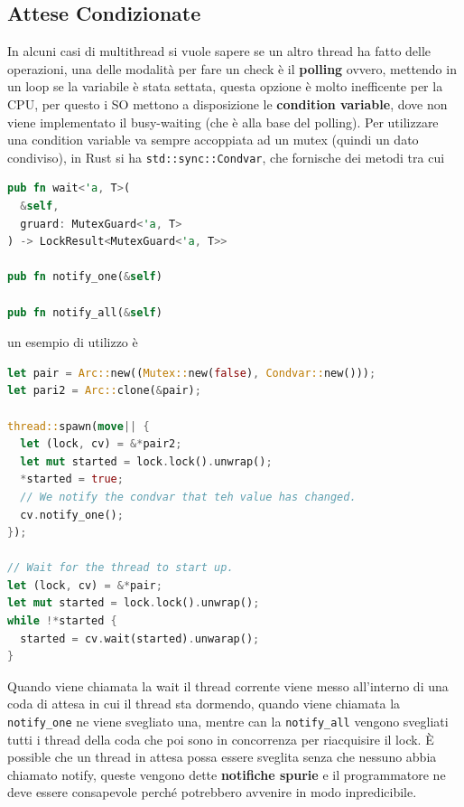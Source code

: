 \documentclass[12pt]{article}
\begin{document}
\subsection{Attese Condizionate}
In alcuni casi di multithread si vuole sapere se un altro thread ha fatto delle operazioni, una delle modalit\`a per fare un check \`e il \textbf{polling} ovvero, mettendo in un loop se la variabile \`e stata settata, questa opzione \`e molto inefficente per la CPU, per questo i SO mettono a disposizione le \textbf{condition variable}, dove non viene implementato il busy-waiting (che \`e alla base del polling). Per utilizzare una condition variable va sempre accoppiata ad un mutex (quindi un dato condiviso), in Rust si ha \texttt{std::sync::Condvar}, che fornische dei metodi tra cui
\begin{lstlisting}[language=rust]
pub fn wait<'a, T>(
  &self,
  gruard: MutexGuard<'a, T>
) -> LockResult<MutexGuard<'a, T>>

pub fn notify_one(&self)

pub fn notify_all(&self)
\end{lstlisting}
un esempio di utilizzo \`e
\begin{lstlisting}[language=rust]
let pair = Arc::new((Mutex::new(false), Condvar::new()));
let pari2 = Arc::clone(&pair);

thread::spawn(move|| {
  let (lock, cv) = &*pair2;
  let mut started = lock.lock().unwrap();
  *started = true;
  // We notify the condvar that teh value has changed.
  cv.notify_one();
});

// Wait for the thread to start up.
let (lock, cv) = &*pair;
let mut started = lock.lock().unwrap();
while !*started {
  started = cv.wait(started).unwarap();
}
\end{lstlisting}
Quando viene chiamata la wait il thread corrente viene messo all'interno di una coda di attesa in cui il thread sta dormendo, quando viene chiamata la \texttt{notify\_one} ne viene svegliato una, mentre can la \texttt{notify\_all} vengono svegliati tutti i thread della coda che poi sono in concorrenza per riacquisire il lock. \`E possible che un thread in attesa possa essere sveglita senza che nessuno abbia chiamato notify, queste vengono dette \textbf{notifiche spurie} e il programmatore ne deve essere consapevole perch\'e potrebbero avvenire in modo inpredicibile.
\end{document}
